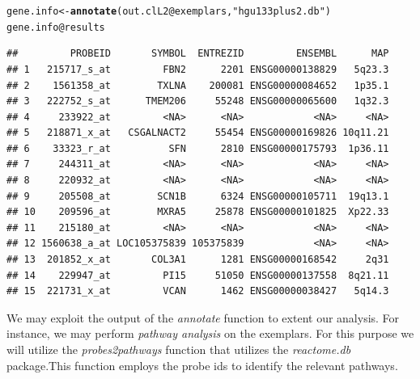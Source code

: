 \documentclass[12pt]{article}\usepackage[]{graphicx}\usepackage[usenames,dvipsnames]{color}
\makeatletter
\newcommand{\hlstr}[1]{\textcolor[rgb]{0.192,0.494,0.8}{#1}}%
\newcommand{\hlopt}[1]{\textcolor[rgb]{0,0,0}{#1}}%
\newcommand{\hlstd}[1]{\textcolor[rgb]{0.345,0.345,0.345}{#1}}%
\newcommand{\hlkwb}[1]{\textcolor[rgb]{0.69,0.353,0.396}{#1}}%
\newcommand{\hlkwc}[1]{\textcolor[rgb]{0.333,0.667,0.333}{#1}}%
\newcommand{\hlkwd}[1]{\textcolor[rgb]{0.737,0.353,0.396}{\textbf{#1}}}%
\newenvironment{kframe}{%
 \def\at@end@of@kframe{}%
 \ifinner\ifhmode%
  \def\at@end@of@kframe{\end{minipage}}%
  \begin{minipage}{\columnwidth}%
 \fi\fi%
 \def\FrameCommand##1{\hskip\@totalleftmargin \hskip-\fboxsep
 \colorbox{shadecolor}{##1}\hskip-\fboxsep
     \hskip-\linewidth \hskip-\@totalleftmargin \hskip\columnwidth}%
 \MakeFramed {\advance\hsize-\width
   \@totalleftmargin\z@ \linewidth\hsize
   \@setminipage}}%
 {\par\unskip\endMakeFramed%
 \at@end@of@kframe}
\newenvironment{knitrout}{}{} %
\makeatother
\begin{document}
\begin{knitrout}
\color{fgcolor}\begin{kframe}
\begin{alltt}
\hlstd{gene.info} \hlkwb{<-} \hlkwd{annotate}\hlstd{(out.clL2}\hlopt{@}\hlkwc{exemplars}\hlstd{,} \hlstr{"hgu133plus2.db"}\hlstd{)}
\hlstd{gene.info}\hlopt{@}\hlkwc{results}
\end{alltt}
\begin{verbatim}
##         PROBEID       SYMBOL  ENTREZID         ENSEMBL      MAP
## 1   215717_s_at         FBN2      2201 ENSG00000138829   5q23.3
## 2    1561358_at        TXLNA    200081 ENSG00000084652   1p35.1
## 3   222752_s_at      TMEM206     55248 ENSG00000065600   1q32.3
## 4     233922_at         <NA>      <NA>            <NA>     <NA>
## 5   218871_x_at   CSGALNACT2     55454 ENSG00000169826 10q11.21
## 6    33323_r_at          SFN      2810 ENSG00000175793  1p36.11
## 7     244311_at         <NA>      <NA>            <NA>     <NA>
## 8     220932_at         <NA>      <NA>            <NA>     <NA>
## 9     205508_at        SCN1B      6324 ENSG00000105711  19q13.1
## 10    209596_at        MXRA5     25878 ENSG00000101825  Xp22.33
## 11    215180_at         <NA>      <NA>            <NA>     <NA>
## 12 1560638_a_at LOC105375839 105375839            <NA>     <NA>
## 13  201852_x_at       COL3A1      1281 ENSG00000168542     2q31
## 14    229947_at         PI15     51050 ENSG00000137558  8q21.11
## 15  221731_x_at         VCAN      1462 ENSG00000038427   5q14.3
\end{verbatim}
\end{kframe}
\end{knitrout}

\noindent  We may exploit the output of the \emph{annotate} function to extent 
our analysis. For instance, we may perform \emph{pathway analysis} on the 
exemplars. For this purpose we will utilize the \emph{probes2pathways} function that utilizes the \emph{reactome.db} package.This function employs the probe ids to identify the relevant pathways.
\end{document}
